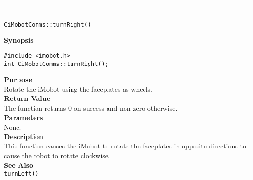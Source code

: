 \noindent
\vspace{5pt}
\rule{4.5in}{0.015in}\\
\noindent
{\LARGE \texttt{CiMobotComms::turnRight()}}\\
{}

\noindent
{\bf Synopsis}\\
\begin{verbatim}
#include <imobot.h>
int CiMobotComms::turnRight();
\end{verbatim}

\noindent
{\bf Purpose}\\
Rotate the iMobot using the faceplates as wheels.\\

\noindent
{\bf Return Value}\\
The function returns 0 on success and non-zero otherwise.\\

\noindent
{\bf Parameters}\\
None.\\

\noindent
{\bf Description}\\
This function causes the iMobot to rotate the faceplates in opposite directions
to cause the robot to rotate clockwise.\\

\noindent
{\bf See Also}\\
\texttt{turnLeft()}


